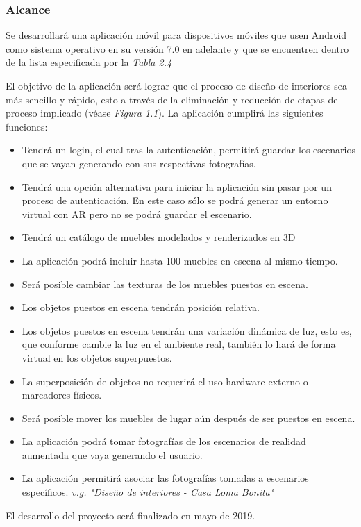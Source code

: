 \subsubsection{Alcance}
Se desarrollará una aplicación móvil para dispositivos móviles que usen Android como sistema operativo en su versión 7.0 en adelante y que se encuentren dentro de la lista especificada por la \textit{Tabla 2.4}\par
El objetivo de la aplicación será lograr que el proceso de diseño de interiores sea más sencillo y rápido, esto a través de la eliminación y reducción de etapas del proceso implicado (véase \textit{Figura 1.1}).
La aplicación cumplirá las siguientes funciones:\par
\begin{itemize}
	\item Tendrá un login, el cual tras la autenticación, permitirá guardar los escenarios que se vayan generando con sus respectivas fotografías.
	\item Tendrá una opción alternativa para iniciar la aplicación sin pasar por un proceso de autenticación. En este caso sólo se podrá generar un entorno virtual con AR pero no se podrá guardar el escenario.
	\item Tendrá un catálogo de muebles modelados y renderizados en 3D
	\item La aplicación podrá incluir hasta 100 muebles en escena al mismo tiempo.
	\item Será posible cambiar las texturas de los muebles puestos en escena.
	\item Los objetos puestos en escena tendrán posición relativa.
	\item Los objetos puestos en escena tendrán una variación dinámica de luz, esto es, que conforme cambie la luz en el ambiente real, también lo hará de forma virtual en los objetos superpuestos.
	\item La superposición de objetos no requerirá el uso hardware externo o marcadores físicos.
	\item Será posible mover los muebles de lugar aún después de ser puestos en escena.
	\item La aplicación podrá tomar fotografías de los escenarios de realidad aumentada que vaya generando el usuario.
	\item La aplicación permitirá asociar las fotografías tomadas a escenarios específicos. \textit{v.g. "Diseño de interiores - Casa Loma Bonita"}
\end{itemize}
\noindent
El desarrollo del proyecto será finalizado en mayo de 2019.
